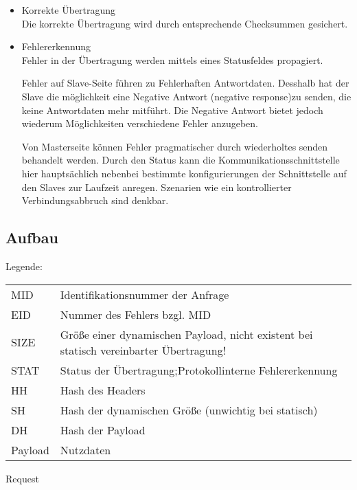 \begin{itemize}
	\item Korrekte Übertragung\\
Die korrekte Übertragung wird durch entsprechende Checksummen gesichert.

	\item Fehlererkennung\\
Fehler in der Übertragung werden mittels eines Statusfeldes propagiert.\par
Fehler auf Slave-Seite führen zu Fehlerhaften Antwortdaten. Desshalb hat der Slave die möglichkeit eine Negative Antwort (negative response)zu senden, die keine Antwortdaten mehr mitführt. Die Negative Antwort bietet jedoch wiederum Möglichkeiten verschiedene Fehler anzugeben.\par
Von Masterseite können Fehler pragmatischer durch wiederholtes senden behandelt werden. Durch den Status kann die Kommunikationsschnittstelle hier hauptsächlich nebenbei bestimmte konfigurierungen der Schnittstelle auf den Slaves zur Laufzeit anregen. Szenarien wie ein kontrollierter Verbindungsabbruch sind denkbar.\par
\end{itemize}
\subsection{Aufbau}

\large 
Legende:\\
\normalsize
\begin{center}
\small
\begin{tabular}{l | l}
MID &	Identifikationsnummer der Anfrage\\
EID &	Nummer des Fehlers bzgl. MID\\
SIZE&	Größe einer dynamischen Payload, nicht existent bei statisch vereinbarter Übertragung!\\
STAT&	Status der Übertragung;Protokollinterne Fehlererkennung\\
HH	&	Hash des Headers\\
SH	&	Hash der dynamischen Größe (unwichtig bei statisch)\\
DH	&	Hash der Payload\\
Payload & Nutzdaten\\
\end{tabular}
\end{center}
\normalsize

\large 
Request\\
\normalsize

